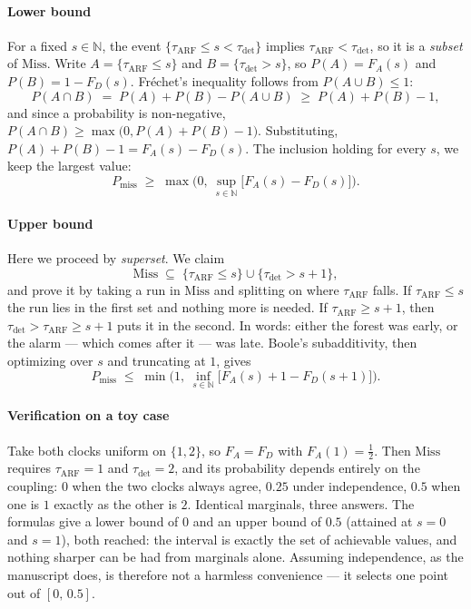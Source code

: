\documentclass[10pt,conference]{IEEEtran}
\theoremstyle{definition}
\begin{document}
\paragraph{Lower bound} For a fixed $s \in \mathbb{N}$, the event
$\{\tau_{\mathrm{ARF}}\le s < \tau_{\mathrm{det}}\}$ implies
$\tau_{\mathrm{ARF}}<\tau_{\mathrm{det}}$, so it is a \emph{subset} of $\mathrm{Miss}$.
Write $A = \{\tau_{\mathrm{ARF}} \le s\}$ and $B = \{\tau_{\mathrm{det}} > s\}$, so
$P(A) = F_A(s)$ and $P(B) = 1 - F_D(s)$. Fréchet's inequality follows from
$P(A \cup B) \le 1$:
\[
  P(A \cap B) \;=\; P(A) + P(B) - P(A \cup B) \;\ge\; P(A) + P(B) - 1 ,
\]
and since a probability is non-negative,
$P(A \cap B) \ge \max\big(0, P(A)+P(B)-1\big)$. Substituting,
$P(A) + P(B) - 1 = F_A(s) - F_D(s)$. The inclusion holding for every $s$, we keep the
largest value:
\[
  P_{\mathrm{miss}} \;\ge\; \max\Big(0,\ \sup_{s\in\mathbb{N}} \big[F_A(s)-F_D(s)\big]\Big).
\]

\paragraph{Upper bound} Here we proceed by \emph{superset}. We claim
\[
  \mathrm{Miss} \;\subseteq\; \{\tau_{\mathrm{ARF}}\le s\} \cup \{\tau_{\mathrm{det}}> s+1\},
\]
and prove it by taking a run in $\mathrm{Miss}$ and splitting on where
$\tau_{\mathrm{ARF}}$ falls. If $\tau_{\mathrm{ARF}} \le s$ the run lies in the first set
and nothing more is needed. If $\tau_{\mathrm{ARF}} \ge s+1$, then
$\tau_{\mathrm{det}} > \tau_{\mathrm{ARF}} \ge s+1$ puts it in the second. In words:
either the forest was early, or the alarm --- which comes after it --- was late. Boole's
subadditivity, then optimizing over $s$ and truncating at $1$, gives
\[
  P_{\mathrm{miss}} \;\le\; \min\Big(1,\ \inf_{s\in\mathbb{N}} \big[F_A(s) + 1 - F_D(s+1)\big]\Big).
\]

\paragraph{Verification on a toy case} Take both clocks uniform on $\{1,2\}$, so
$F_A = F_D$ with $F_A(1) = \tfrac12$. Then $\mathrm{Miss}$ requires
$\tau_{\mathrm{ARF}} = 1$ and $\tau_{\mathrm{det}} = 2$, and its probability depends
entirely on the coupling: $0$ when the two clocks always agree, $0.25$ under
independence, $0.5$ when one is $1$ exactly as the other is $2$. Identical marginals,
three answers. The formulas give a lower bound of $0$ and an upper bound of $0.5$
(attained at $s = 0$ and $s = 1$), both reached: the interval is exactly the set of
achievable values, and nothing sharper can be had from marginals alone. Assuming
independence, as the manuscript does, is therefore not a harmless convenience --- it
selects one point out of $[0,\,0.5]$.
\end{document}
